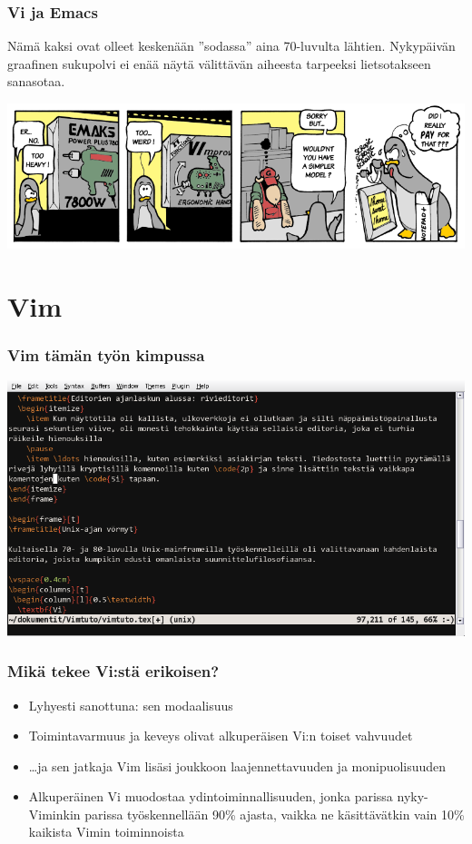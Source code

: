 \documentclass[]{beamer}
\begin{document}
\begin{frame}[plain]
    \frametitle{Vi ja Emacs}
    Nämä kaksi ovat olleet keskenään ''sodassa'' aina 70-luvulta lähtien. Nykypäivän graafinen sukupolvi ei enää näytä välittävän aiheesta tarpeeksi lietsotakseen sanasotaa.

    \includegraphics[width=\textwidth]{0010_en_vi-vs-emacs}
\end{frame}

\section{Vim}

\begin{frame}
  \frametitle{Vim tämän työn kimpussa}
  \includegraphics[width=\textwidth]{gvim}
\end{frame}

\begin{frame}
\frametitle{Mikä tekee Vi:stä erikoisen?}
\begin{itemize}
    \item Lyhyesti sanottuna: sen modaalisuus
    \item Toimintavarmuus ja keveys olivat alkuperäisen Vi:n toiset vahvuudet
    \item \ldots ja sen jatkaja Vim lisäsi joukkoon laajennettavuuden ja monipuolisuuden
    \pause
    \item Alkuperäinen Vi muodostaa ydintoiminnallisuuden, jonka parissa nyky-Viminkin parissa työskennellään 90\% ajasta, vaikka ne käsittävätkin vain 10\% kaikista Vimin toiminnoista
\end{itemize}
\end{frame}
\end{document}
